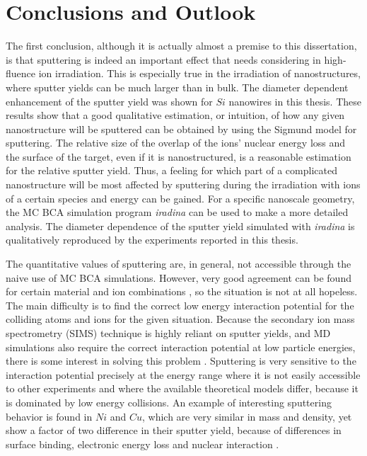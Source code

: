 \chapter{Conclusions and Outlook}

The first conclusion, although it is actually almost a premise to this dissertation, is that sputtering is indeed an important effect that needs considering in high-fluence ion irradiation. This is especially true in the irradiation of nanostructures, where sputter yields can be much larger than in bulk. The diameter dependent enhancement of the sputter yield was shown for $Si$ nanowires in this thesis. These results show that a good qualitative estimation, or intuition, of how any given nanostructure will be sputtered can be obtained by using the Sigmund model for sputtering. The relative size of the overlap of the ions' nuclear energy loss and the surface of the target, even if it is nanostructured, is a reasonable estimation for the relative sputter yield. Thus, a feeling for which part of a complicated nanostructure will be most affected by sputtering during the irradiation with ions of a certain species and energy can be gained. For a specific nanoscale geometry, the MC BCA simulation program \emph{iradina} \cite{borschel_ion_2011} can be used to make a more detailed analysis. The diameter dependence of the sputter yield simulated with \emph{iradina} is qualitatively reproduced by the experiments reported in this thesis.

The quantitative values of sputtering are, in general, not accessible through the naive use of MC BCA simulations. However, very good agreement can be found for certain material and ion combinations \cite{biersack_computer_1987,hofsass_simulation_2014}, so the situation is not at all hopeless. The main difficulty is to find the correct low energy interaction potential for the colliding atoms and ions for the given situation. Because the secondary ion mass spectrometry (SIMS) technique is highly reliant on sputter yields, and MD simulations also require the correct interaction potential at low particle energies, there is some interest in solving this problem \cite{nordlund_interatomic_2008}. Sputtering is very sensitive to the interaction potential precisely at the energy range where it is not easily accessible to other experiments and where the available theoretical models differ, because it is dominated by low energy collisions. An example of interesting sputtering behavior is found in $Ni$ and $Cu$, which are very similar in mass and density, yet show a factor of two difference in their sputter yield, because of differences in surface binding, electronic energy loss and nuclear interaction \cite{biersack_computer_1987}. 

